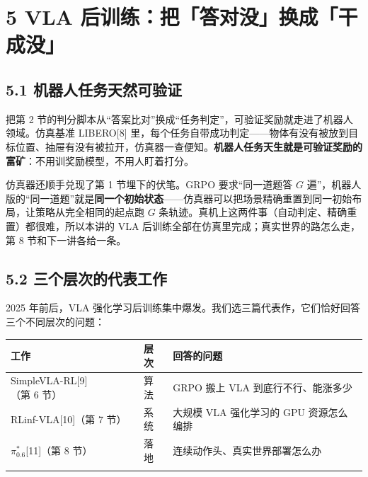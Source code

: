 \documentclass[
  chinese,
]{ctexart}
\begin{document}
\section{5 VLA
后训练：把「答对没」换成「干成没」}\label{vla-ux540eux8badux7ec3ux628aux7b54ux5bf9ux6ca1ux6362ux6210ux5e72ux6210ux6ca1}

\subsection{5.1
机器人任务天然可验证}\label{ux673aux5668ux4ebaux4efbux52a1ux5929ux7136ux53efux9a8cux8bc1}

把第 2
节的判分脚本从``答案比对''换成``任务判定''，可验证奖励就走进了机器人领域。仿真基准
LIBERO{[}8{]}
里，每个任务自带成功判定------物体有没有被放到目标位置、抽屉有没有被拉开，仿真器一查便知。\textbf{机器人任务天生就是可验证奖励的富矿}：不用训奖励模型，不用人盯着打分。

仿真器还顺手兑现了第 1 节埋下的伏笔。GRPO 要求``同一道题答 \(G\)
遍''，机器人版的``同一道题''就是\textbf{同一个初始状态}------仿真器可以把场景精确重置到同一初始布局，让策略从完全相同的起点跑
\(G\) 条轨迹。真机上这两件事（自动判定、精确重置）都很难，所以本讲的 VLA
后训练全部在仿真里完成；真实世界的路怎么走，第 8 节和下一讲各给一条。

\subsection{5.2
三个层次的代表工作}\label{ux4e09ux4e2aux5c42ux6b21ux7684ux4ee3ux8868ux5de5ux4f5c}

2025 年前后，VLA
强化学习后训练集中爆发。我们选三篇代表作，它们恰好回答三个不同层次的问题：

\begin{center}
\begin{tabular}{@{}>{\raggedright\arraybackslash}p{} >{\raggedright\arraybackslash}p{} >{\raggedright\arraybackslash}p{}@{}}
\toprule\noalign{}
工作 & 层次 & 回答的问题 \\
\midrule\noalign{}
SimpleVLA-RL{[}9{]}（第 6 节） & 算法 & GRPO 搬上 VLA 到底行不行、能涨多少 \\
RLinf-VLA{[}10{]}（第 7 节） & 系统 & 大规模 VLA 强化学习的 GPU 资源怎么编排 \\
\(\pi^{*}_{0.6}\){[}11{]}（第 8 节） & 落地 & 连续动作头、真实世界部署怎么办 \\
\bottomrule\noalign{}
\end{tabular}
\end{center}
\end{document}
